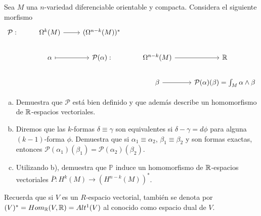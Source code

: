 \documentclass[twoside]{article}
\begin{document}
\begin{ejercicio}{4}
Sea $M$ una $n$-variedad diferenciable orientable y compacta. Considera el siguiente morfismo
\[
\begin{tikzcd}
\mathcal{P}: & \Omega^k(M)\arrow[r]    & (\Omega^{n-k}(M))^*  &                  & \\
             & \alpha\arrow[r, mapsto] & \mathcal{P}(\alpha): & \Omega^{n-k}(M)\arrow[r]  & \R\\
             &		                   &					  &  \beta\arrow[r]  &\mathcal{P}(\alpha)(\beta)=\int_M \alpha\land\beta
\end{tikzcd}
\]
\begin{enumerate}[a)]
\item Demuestra que $\mathcal{P}$ está bien definido y que además describe un homomorfismo de $\mathbb{R}$-espacios vectoriales.
\item Diremos que las $k$-formas $\delta\equiv\gamma$ son equivalentes si $\delta-\gamma=d\phi$ para alguna $(k-1)$-forma $\phi$. Demuestra que si $\alpha_1\equiv \alpha_2$, $\beta_1\equiv\beta_2$ y son formas exactas, entonces $\mathcal{P}(\alpha_1)(\beta_1)=\mathcal{P}(\alpha_2)(\beta_2)$. 
\item Utilizando b), demuestra que $\mathbb{P}$ induce un homomorfismo de $\mathbb{R}$-espacios vectoriales $\overline{P}:H^k(M)\to (H^{n-k}(M))^*$.
\end{enumerate}
\begin{nota}
Recuerda que si $V$ es un $R$-espacio vectorial, también se denota por $(V)^*=Hom_{\mathbb{R}}(V,\mathbb{R})=Alt^1(V)$ al conocido como espacio dual de $V$.
\end{nota}
\end{ejercicio}
\begin{solucion}

\end{solucion}
\end{document}
